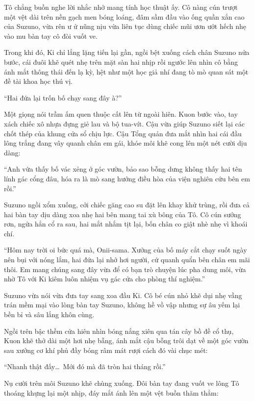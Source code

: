 \documentclass[../main.tex]{subfiles}
\begin{document}
Tô chẳng buồn nghe lời nhắc nhở mang tính học thuật ấy. Cô nàng cún trượt một vệt dài trên nền gạch men bóng loáng, đâm sầm đầu vào ống quần xắn cao của Suzuno, vừa rên ư ử nũng nịu vừa liên tục dùng chiếc mũi ươn ướt hếch nhẹ vào mu bàn tay cô đòi vuốt ve.

Trong khi đó, Ki chỉ lẳng lặng tiến lại gần, ngồi bệt xuống cách chân Suzuno nửa bước, cái đuôi khẽ quét nhẹ trên mặt sàn hai nhịp rồi ngước lên nhìn cô bằng ánh mắt thông thái đến lạ kỳ, hệt như một học giả nhí đang tò mò quan sát một đề tài khoa học thú vị.

``Hai đứa lại trốn bố chạy sang đây à?''

Một giọng nói trầm ấm quen thuộc cất lên từ ngoài hiên. Kuon bước vào, tay xách chiếc xô nhựa đựng giẻ lau và bộ tua-vít. Cậu vừa giúp Suzuno siết lại các chốt thép của khung cửa sổ chịu lực. Cậu Tổng quản đưa mắt nhìn hai cái đầu lông trắng đang vây quanh chân em gái, khóe môi khẽ cong lên một nét cười dịu dàng:

``Anh vừa thấy bố vác xẻng ở góc vườn, bảo sao bỗng dưng không thấy hai tên lính gác cổng đâu, hóa ra là mò sang hưởng điều hòa của viện nghiên cứu bên em rồi.''

Suzuno ngồi xổm xuống, cởi chiếc găng cao su đặt lên khay khử trùng, rồi đưa cả hai bàn tay dịu dàng xoa nhẹ hai bên mang tai xù bông của Tô. Cô cún sướng rơn, ngửa hẳn cổ ra sau, hai mắt nhắm tịt lại, bốn chân co giật nhè nhẹ vì khoái chí.

``Hôm nay trời oi bức quá mà, Onii-sama. Xưởng của bố máy cắt chạy suốt ngày nên bụi với nóng lắm, hai đứa lại nhớ hơi người, cứ quanh quẩn bên chân em mãi thôi. Em mang chúng sang đây vừa để có bạn trò chuyện lúc pha dung môi, vừa nhờ Tô với Ki kiêm luôn nhiệm vụ gác cửa cho phòng thí nghiệm.''

Suzuno vừa nói vừa đưa tay sang xoa đầu Ki. Cô bé cún nhỏ khẽ dụi nhẹ vầng trán mềm mại vào lòng bàn tay Suzuno, không hề vồ vập nhưng sự âu yếm lại bền bỉ và sâu lắng khôn cùng.

Ngồi trên bậc thềm cửa hiên nhìn bóng nắng xiên qua tán cây bồ đề cổ thụ, Kuon khẽ thở dài một hơi nhẹ bẫng, ánh mắt cậu bỗng trôi dạt về một góc vườn sau xưởng cơ khí phủ đầy bóng râm mát rượi cách đó vài chục mét:

``Nhanh thật đấy\dots\ Mới đó mà đã tròn hai tháng rồi.''

Nụ cười trên môi Suzuno khẽ chùng xuống. Đôi bàn tay đang vuốt ve lông Tô thoáng khựng lại một nhịp, đáy mắt ánh lên một vệt buồn thăm thẳm:
\end{document}
